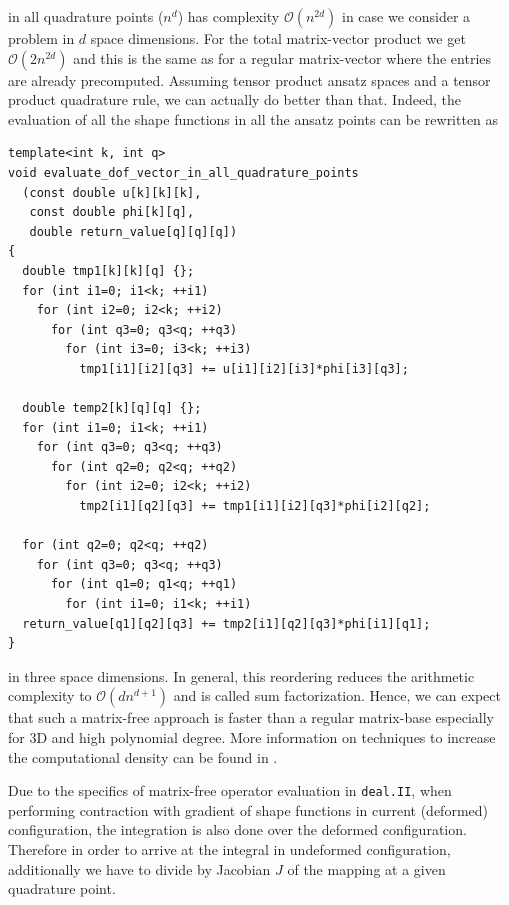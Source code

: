 \documentclass[preprint,12pt,times]{elsarticle}
\begin{document}
in all quadrature points ($n^d$) has complexity $\mathcal{O}(n^{2d})$ in case we consider a problem in $d$ space dimensions. For the total matrix-vector product we get $\mathcal{O}(2n^{2d})$
and this is the same as for a regular matrix-vector where the entries are already precomputed. Assuming tensor product ansatz spaces and a tensor product quadrature rule, we can actually do better
than that. Indeed, the evaluation of all the shape functions in all the ansatz points can be rewritten as
\begin{lstlisting}
template<int k, int q>
void evaluate_dof_vector_in_all_quadrature_points
  (const double u[k][k][k],
   const double phi[k][q],
   double return_value[q][q][q])
{
  double tmp1[k][k][q] {};
  for (int i1=0; i1<k; ++i1)
    for (int i2=0; i2<k; ++i2)
      for (int q3=0; q3<q; ++q3)
        for (int i3=0; i3<k; ++i3)
          tmp1[i1][i2][q3] += u[i1][i2][i3]*phi[i3][q3];

  double temp2[k][q][q] {};
  for (int i1=0; i1<k; ++i1)
    for (int q3=0; q3<q; ++q3)
      for (int q2=0; q2<q; ++q2)
        for (int i2=0; i2<k; ++i2)
          tmp2[i1][q2][q3] += tmp1[i1][i2][q3]*phi[i2][q2];

  for (int q2=0; q2<q; ++q2)
    for (int q3=0; q3<q; ++q3)
      for (int q1=0; q1<q; ++q1)
        for (int i1=0; i1<k; ++i1)
  return_value[q1][q2][q3] += tmp2[i1][q2][q3]*phi[i1][q1];
}
\end{lstlisting}
in three space dimensions. In general, this reordering reduces the arithmetic complexity to $\mathcal{O}(dn^{d+1})$ and is called sum factorization.
Hence, we can expect that such a matrix-free approach is faster than a regular matrix-base especially for 3D and high polynomial degree.
More information on techniques to increase the computational density can be found in \cite{kronbichler12,vos10}.

Due to the specifics of matrix-free operator evaluation in \texttt{deal.II}, when performing contraction with gradient of shape functions in current (deformed) configuration, the integration is also done over the deformed configuration. Therefore in order to arrive at the integral in undeformed configuration, additionally we have to divide by Jacobian $J$ of the mapping at a given quadrature point.
\end{document}
